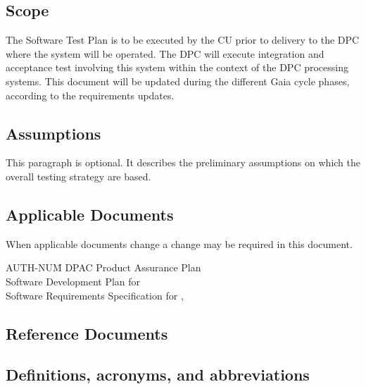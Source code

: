 \documentclass[CUx,lsstdraft,STP]{lsstdoc}
\begin{document}
\subsection{Scope \label{sect:scope}}

The Software Test Plan is to be executed by the CU prior to delivery to the DPC where the system will be operated. The DPC will execute integration and acceptance test involving this system within the context of the DPC processing systems.
This document will be updated during the different Gaia cycle phases, according to the requirements updates.

\subsection{Assumptions}  
This paragraph is optional. It describes the preliminary assumptions on which the overall testing strategy are based.
 
\subsection{Applicable Documents \label{sect:ad}}
When applicable documents change a change may be required in this document.
\begin{tabbing}
AUTH-NUM\= \kill 
{}\>	DPAC Product Assurance Plan \\
 \>	Software Development Plan for \CU \\
\>	Software Requirements Specification for \product,\\
\end{tabbing}

\subsection{Reference Documents}

\renewcommand{\refname}{}



\subsection{Definitions, acronyms, and abbreviations \label{sect:acronyms}} 

\end{document}
